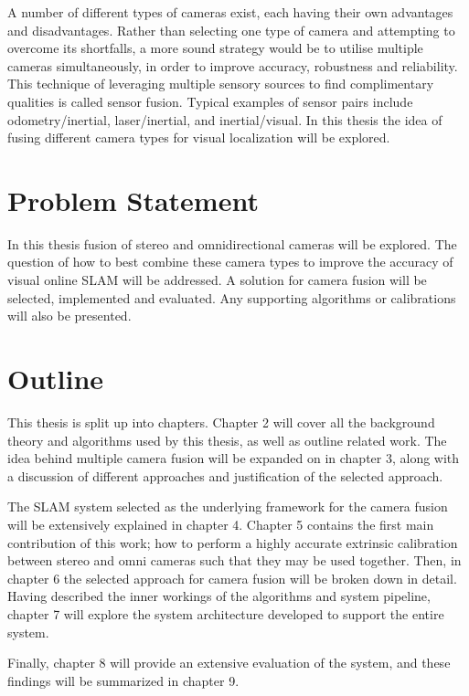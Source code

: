 A number of different types of cameras exist, each having their own advantages and disadvantages.  Rather than selecting one type of camera and attempting to overcome its shortfalls, a more sound strategy would be to utilise multiple cameras simultaneously, in order to improve accuracy, robustness and reliability.  This technique of leveraging multiple sensory sources to find complimentary qualities is called sensor fusion.  Typical examples of sensor pairs include odometry/inertial, laser/inertial, and inertial/visual.  In this thesis the idea of fusing different camera types for visual localization will be explored.

\section{Problem Statement}

In this thesis fusion of stereo and omnidirectional cameras will be explored.  The question of how to best combine these camera types to improve the accuracy of visual online SLAM will be addressed.  A solution for camera fusion will be selected, implemented and evaluated.  Any supporting algorithms or calibrations will also be presented.

\section{Outline}

This thesis is split up into chapters.  Chapter 2 will cover all the background theory and  algorithms used by this thesis, as well as outline related work.  The idea behind multiple camera fusion will be expanded on in chapter 3, along with a discussion of different approaches and justification of the selected approach. 

The SLAM system selected as the underlying framework for the camera fusion will be extensively explained in chapter 4.  Chapter 5 contains the first main contribution of this work; how to perform a highly accurate extrinsic calibration between stereo and omni cameras such that they may be used together.  Then, in chapter 6 the selected approach for camera fusion will be broken down in detail.  Having described the inner workings of the algorithms and system pipeline, chapter 7 will explore the system architecture developed to support the entire system.

Finally, chapter 8 will provide an extensive evaluation of the system, and these findings will be summarized in chapter 9.